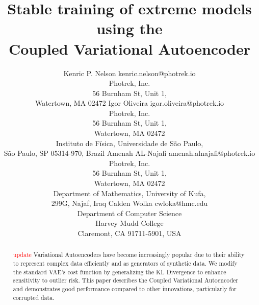 \documentclass[twoside,11pt]{article}
\begin{document}
\title{Stable training of extreme models using the \\ Coupled Variational Autoencoder}

\author{\name Kenric P. Nelson     \email kenric.nelson@photrek.io \\
        \addr Photrek, Inc.\\ 56 Burnham St, Unit 1, \\
        Watertown, MA 02472
        \AND
        \name Igor Oliveira     \email igor.oliveira@photrek.io \\
        \addr Photrek, Inc.\\ 56 Burnham St, Unit 1, \\
        Watertown, MA 02472 \\
        \addr Instituto de F\'isica, Universidade de S\~ao Paulo, \\
        S\~ao Paulo, SP 05314-970, Brazil
        \AND
        \name Amenah AL-Najafi      \email amenah.alnajafi@photrek.io \\
        \addr Photrek, Inc.\\ 56 Burnham St, Unit 1, \\
        Watertown, MA 02472 \\
        \addr Department of Mathematics, University of Kufa, \\
        299G, Najaf, Iraq
        \AND
        \name Calden Wolka      \email cwloka@hmc.edu \\
        \addr Department of Computer Science\\
        Harvey Mudd College \\
        Claremont, CA 91711-5901, USA 
}


\maketitle

\begin{abstract}%
\textcolor{red}{update}
Variational Autoencoders have become increasingly popular due to their ability to represent complex data efficiently and as generators of synthetic data. We modify the standard VAE's cost function by generalizing the KL Divergence to enhance sensitivity to outlier risk. This paper describes the Coupled Variational Autoencoder and demonstrates good performance compared to other innovations, particularly for corrupted data.\end{abstract}
\end{document}
